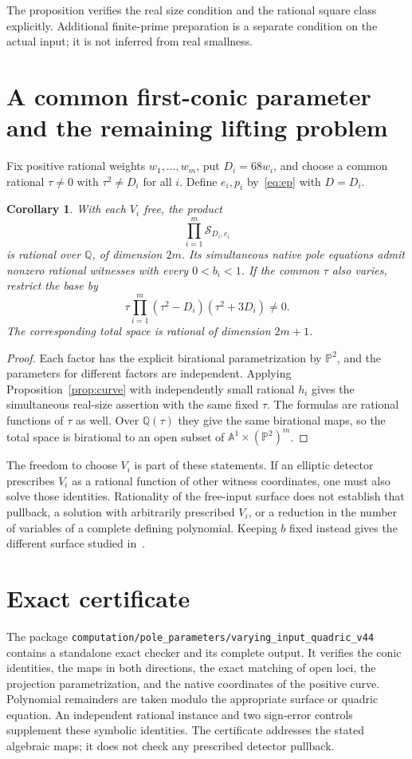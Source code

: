 \documentclass[11pt,a4paper]{article}
\newtheorem{corollary}[theorem]{Corollary}
\theoremstyle{remark}\newtheorem{remark}[theorem]{Remark}
\newcommand{\Q}{\mathbb Q}\newcommand{\PP}{\mathbb P}
\begin{document}
The proposition verifies the real size condition and the rational square
class explicitly. Additional finite-prime preparation is a separate
condition on the actual input; it is not inferred from real smallness.

\section{A common first-conic parameter and the remaining lifting problem}
Fix positive rational weights $w_1,\ldots,w_m$, put $D_i=68w_i$,
and choose a common rational $\tau\ne0$ with $\tau^2\ne D_i$ for all
$i$. Define $e_i,p_i$ by~\eqref{eq:ep} with $D=D_i$.

\begin{corollary}\label{cor:product}
With each $V_i$ free, the product
\[
                         \prod_{i=1}^m\mathcal S_{D_i,e_i}
\]
is rational over $\Q$, of dimension $2m$. Its simultaneous native
pole equations admit nonzero rational witnesses with every
$0<b_i<1$. If the common $\tau$ also varies, restrict the base by
\[
                \tau\prod_{i=1}^m(\tau^2-D_i)(\tau^2+3D_i)\ne0.
\]
The corresponding total space is rational of dimension $2m+1$.
\end{corollary}
\begin{proof}
Each factor has the explicit birational parametrization by $\PP^2$,
and the parameters for different factors are independent. Applying
Proposition~\ref{prop:curve} with independently small rational $h_i$
gives the simultaneous real-size assertion with the same fixed $\tau$.
The formulas are rational functions of $\tau$ as well. Over $\Q(\tau)$
they give the same birational maps, so the total space is birational
to an open subset of $\mathbb A^1\times(\PP^2)^m$.
\end{proof}

The freedom to choose $V_i$ is part of these statements. If an elliptic
detector prescribes $V_i$ as a rational function of other witness
coordinates, one must also solve those identities. Rationality of the
free-input surface does not establish that pullback, a solution with
arbitrarily prescribed $V_i$, or a reduction in the number of variables
of a complete defining polynomial. Keeping $b$ fixed instead gives
the different surface studied in~\cite{Fixed,Sections}.

\section{Exact certificate}
The package \nolinkurl{computation/pole_parameters/varying_input_quadric_v44}
contains a standalone exact checker and its complete output. It verifies
the conic identities, the maps in both directions, the exact matching
of open loci, the projection parametrization, and the native coordinates
of the positive curve. Polynomial remainders are taken modulo the
appropriate surface or quadric equation. An independent rational
instance and two sign-error controls supplement these symbolic identities.
The certificate addresses the stated algebraic maps; it does not check
any prescribed detector pullback.
\end{document}
